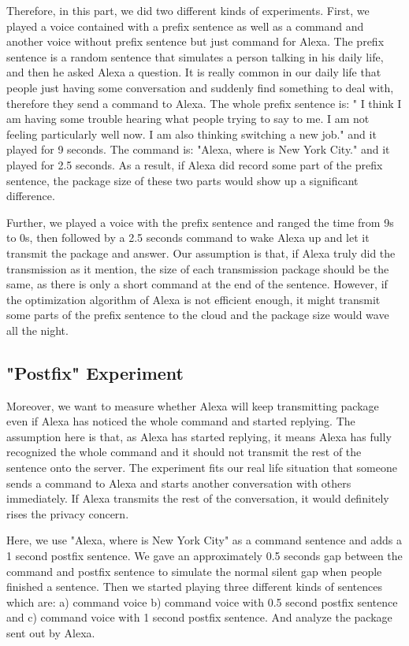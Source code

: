 Therefore, in this part, we did two different kinds of experiments. First, we played a voice contained with a prefix sentence as well as a command and another voice without prefix sentence but just command for Alexa. The prefix sentence is a random sentence that simulates a person talking in his daily life, and then he asked Alexa a question. It is really common in our daily life that people just having some conversation and suddenly find something to deal with, therefore they send a command to Alexa. The whole prefix sentence is: " I think I am having some trouble hearing what people trying to say to me. I am not feeling particularly well now. I am also thinking switching a new job." and it played for 9 seconds. The command is: "Alexa, where is New York City." and it played for 2.5 seconds. As a result, if Alexa did record some part of the prefix sentence, the package size of these two parts would show up a significant difference.

Further, we played a voice with the prefix sentence and ranged the time from 9s to 0s, then followed by a 2.5 seconds command to wake Alexa up and let it transmit the package and answer. Our assumption is that, if Alexa truly did the transmission as it mention, the size of each transmission package should be the same, as there is only a short command at the end of the sentence. However, if the optimization algorithm of Alexa is not efficient enough, it might transmit some parts of the prefix sentence to the cloud and the package size would wave all the night.
 

\subsection{"Postfix" Experiment}
  
Moreover, we want to measure whether Alexa will keep transmitting package even if Alexa has noticed the whole command and started replying. The assumption here is that, as Alexa has started replying, it means Alexa has fully recognized the whole command and it should not transmit the rest of the sentence onto the server. The experiment fits our real life situation that someone sends a command to Alexa and starts another conversation with others immediately. If Alexa transmits the rest of the conversation, it would definitely rises the privacy concern.

Here, we use "Alexa, where is New York City" as a command sentence and adds a 1 second postfix sentence. We gave an approximately 0.5 seconds gap between the command and postfix sentence to simulate the normal silent gap when people finished a sentence. Then we started playing three different kinds of sentences which are: a) command voice b) command voice with 0.5 second postfix sentence and c) command voice with 1 second postfix sentence. And analyze the package sent out by Alexa.


